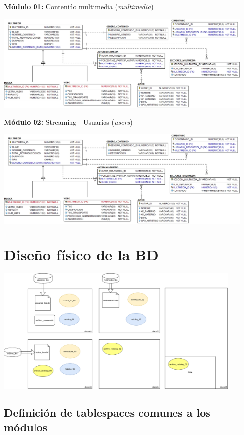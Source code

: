 \documentclass{article}
\begin{document}
\textbf{Módulo 01:} Contenido multimedia (\textit{multimedia})

\begin{center}
\includegraphics[width=0.95\textwidth]{media-stream-modulo-01}
\end{center}

\textbf{Módulo 02:} Streaming - Usuarios (\textit{users})

\begin{center}
\includegraphics[width=0.95\textwidth]{media-stream-modulo-01}
\end{center}

\section{Diseño físico de la BD}

\includegraphics[width=0.9\textwidth]{arquitectura-bd-mediastream.png}

\subsection{Definición de tablespaces comunes a los módulos}
\end{document}
